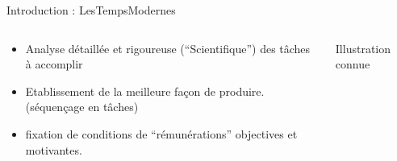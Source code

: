 \begin{Frame}{Introduction : LesTempsModernes}
 \begin{columns}[t]
  \begin{column}{\BW}
    \begin{block}{}
      \begin{itemize}
      \item Analyse détaillée et rigoureuse (``Scientifique'') des
        tâches à accomplir
      \item Etablissement de la meilleure façon de
        produire. (séquençage en tâches)
      \item fixation de conditions de ``rémunérations'' objectives et motivantes.
      \end{itemize}
    \end{block}
  \end{column}
  \begin{column}{\BW}
    \begin{block}{Illustration connue}
    \end{block}
  \end{column}

 \end{columns}
\end{Frame}
